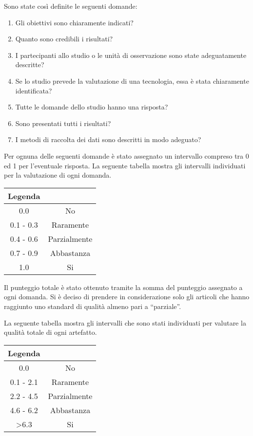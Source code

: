 Sono state così definite le seguenti domande:
\begin{enumerate}[start=0,label={(\bfseries R\arabic*):}]
	\item Gli obiettivi sono chiaramente indicati?
	\item Quanto sono credibili i risultati?
	\item I partecipanti allo studio o le unità di osservazione sono state adeguatamente descritte?
	\item Se lo studio prevede la valutazione di una tecnologia, essa è stata chiaramente identificata?
	\item Tutte le domande dello studio hanno una risposta?
	\item Sono presentati tutti i risultati?
	\item I metodi di raccolta dei dati sono descritti in modo adeguato?
\end{enumerate}

Per ognuna delle seguenti domande è stato assegnato un intervallo compreso tra 0 ed 1 per l’eventuale risposta. La seguente tabella mostra gli intervalli individuati per la valutazione di ogni domanda.

\begin{table}[h]
	\centering
	\begin{tabular}{|c|c|}
		\hline
		\textbf{Legenda} & \textbf{}    \\ \hline
		0.0              & No           \\ \hline
		0.1 - 0.3        & Raramente    \\ \hline
		0.4 - 0.6        & Parzialmente \\ \hline
		0.7 - 0.9        & Abbastanza   \\ \hline
		1.0              & Si           \\ \hline
	\end{tabular}
\end{table}

Il punteggio totale è stato ottenuto tramite la somma del punteggio assegnato a ogni domanda. Si è deciso di prendere in considerazione solo gli articoli che hanno raggiunto uno standard di qualità almeno pari a “parziale”.

La seguente tabella mostra gli intervalli che sono stati individuati per valutare la qualità totale di ogni artefatto.

\begin{table}[h]
	\centering
	\begin{tabular}{|c|c|}
		\hline
		\textbf{Legenda}  & \textbf{}    \\ \hline
		0.0               & No           \\ \hline
		0.1 - 2.1         & Raramente    \\ \hline
		\rowcolor[HTML]{34FF34} 
		2.2 - 4.5         & Parzialmente \\ \hline
		\rowcolor[HTML]{34FF34} 
		4.6 - 6.2         & Abbastanza   \\ \hline
		\rowcolor[HTML]{34FF34} 
		\textgreater{}6.3 & Si           \\ \hline
	\end{tabular}
\end{table}

